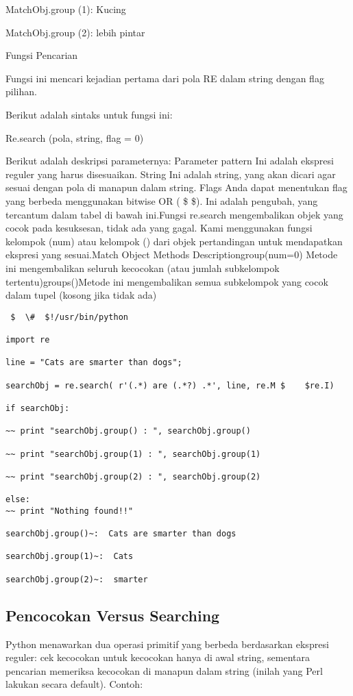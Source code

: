 \begin {enumerate}
\begin {enumerate}
MatchObj.group (1): Kucing

MatchObj.group (2): lebih pintar

Fungsi Pencarian

Fungsi ini mencari kejadian pertama dari pola RE dalam string dengan flag pilihan.

Berikut adalah sintaks untuk fungsi ini:

Re.search (pola, string, flag = 0)

Berikut adalah deskripsi parameternya:
Parameter pattern Ini adalah ekspresi reguler yang harus disesuaikan. String Ini adalah string, yang akan dicari agar sesuai dengan pola di manapun dalam string. Flags Anda dapat menentukan flag yang berbeda menggunakan bitwise OR ( \$    \$). Ini adalah pengubah, yang tercantum dalam tabel di bawah ini.Fungsi re.search mengembalikan objek yang cocok pada kesuksesan, tidak ada yang gagal. Kami menggunakan fungsi kelompok (num) atau kelompok () dari objek pertandingan untuk mendapatkan ekspresi yang sesuai.Match Object Methods Descriptiongroup(num=0) Metode ini mengembalikan seluruh kecocokan (atau jumlah subkelompok tertentu)groups()Metode ini mengembalikan semua subkelompok yang cocok dalam tupel (kosong jika tidak ada)

\begin{verbatim}
 $  \#  $!/usr/bin/python

import re

line = "Cats are smarter than dogs";

searchObj = re.search( r'(.*) are (.*?) .*', line, re.M $    $re.I)

if searchObj:

~~ print "searchObj.group() : ", searchObj.group()

~~ print "searchObj.group(1) : ", searchObj.group(1)

~~ print "searchObj.group(2) : ", searchObj.group(2)

else:
~~ print "Nothing found!!"

searchObj.group()~:  Cats are smarter than dogs

searchObj.group(1)~:  Cats

searchObj.group(2)~:  smarter
\end{verbatim}

\subsection{Pencocokan Versus Searching}
Python menawarkan dua operasi primitif yang berbeda berdasarkan ekspresi reguler: cek kecocokan untuk kecocokan hanya di awal string, sementara pencarian memeriksa kecocokan di manapun dalam string (inilah yang Perl lakukan secara default).
Contoh:


\end{enumerate}
\end{enumerate}
